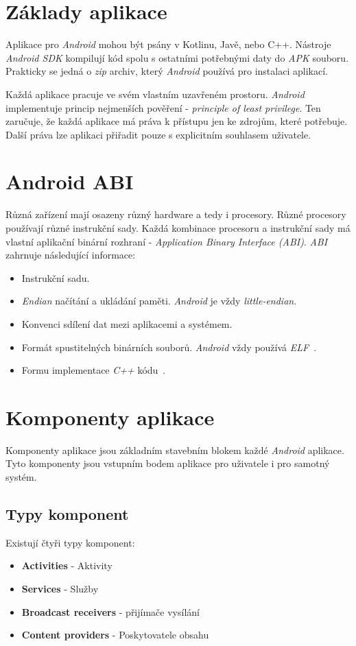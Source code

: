 \section{Základy aplikace}
Aplikace pro \emph{Android} mohou být psány v Kotlinu, Javě, nebo C++. Nástroje \emph{Android SDK} kompilují kód spolu s ostatními potřebnými daty do \emph{APK} souboru. Prakticky se jedná o \emph{zip} archiv, který \emph{Android} používá pro instalaci aplikací.

Každá aplikace pracuje ve svém vlastním uzavřeném prostoru. \emph{Android} implementuje princip nejmenších pověření - \emph{principle of least privilege}. Ten zaručuje, že každá aplikace má práva k přístupu jen ke zdrojům, které potřebuje. Další práva lze aplikaci přiřadit pouze s explicitním souhlasem uživatele.

\section{Android ABI}\label{sec:zaklady_abi}
Různá zařízení mají osazeny různý hardware a tedy i procesory. Různé procesory používají různé instrukční sady. Každá kombinace procesoru a instrukční sady má vlastní aplikační binární rozhraní - \emph{Application Binary Interface (ABI)}. \emph{ABI}~ zahrnuje následující informace:
\begin{itemize}
    \item Instrukční sadu.
    \item \emph{Endian} načítání a ukládání paměti. \emph{Android} je vždy \emph{little-endian}.
    \item Konvenci sdílení dat mezi aplikacemi a systémem.
    \item Formát spustitelných binárních souborů. \emph{Android} vždy používá \emph{ELF}~.
    \item Formu implementace \emph{C++} kódu~.
\end{itemize}

\section{Komponenty aplikace}
Komponenty aplikace jsou základním stavebním blokem každé \emph{Android} aplikace. Tyto komponenty jsou vstupním bodem aplikace pro uživatele i pro samotný systém.

    \subsection{Typy komponent}
    Existují čtyři typy komponent:
    \begin{itemize}
        \item \textbf{Activities} - Aktivity
        \item \textbf{Services} - Služby
        \item \textbf{Broadcast receivers} - přijímače vysílání
        \item \textbf{Content providers} - Poskytovatele obsahu
    \end{itemize}

